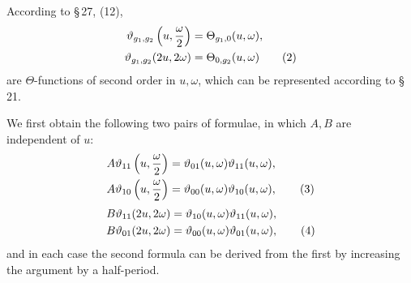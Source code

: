 \documentclass[11pt]{article}
\providecommand{\tht}{\vartheta}
\begin{document}
According to \S\,27, (12),
\begin{align}
\tht_{g_1,g_2}\left(u,{\omega\over2}\right)&=\Theta_{g_1,0}(u,\omega),\notag\\
\tht_{g_1,g_2}(2u,2\omega)&=\Theta_{0,g_2}(u,\omega) \tag{2}
\end{align}
are $\Theta$-functions of second order in $u,\omega$, which can be represented according to \S\,21.

We first obtain the following two pairs of formulae, in which $A,B$ are independent of $u$:
\begin{align}
A\tht_{11}\left(u,{\omega\over2}\right)&=\tht_{01}(u,\omega)\tht_{11}(u,\omega),\notag\\
A\tht_{10}\left(u,{\omega\over2}\right)&=\tht_{00}(u,\omega)\tht_{10}(u,\omega), \tag{3}
\end{align}
\begin{align}
B\tht_{11}(2u,2\omega)&=\tht_{10}(u,\omega)\tht_{11}(u,\omega),\notag\\
B\tht_{01}(2u,2\omega)&=\tht_{00}(u,\omega)\tht_{01}(u,\omega), \tag{4}
\end{align}
and in each case the second formula can be derived from the first by increasing the argument by a half-period.
\end{document}
